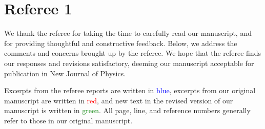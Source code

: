 \documentclass[preprint]{revtex4-1}
\newcommand{\1}{\mathds{1}}
\newcommand{\blue}[1]{\textcolor{blue}{#1}}
\newcommand{\red}[1]{\textcolor{red}{#1}}
\newcommand{\green}[1]{\textcolor{green}{#1}}
\begin{document}
\section*{Referee 1}

We thank the referee for taking the time to carefully read our
manuscript, and for providing thoughtful and constructive feedback.
Below, we address the comments and concerns brought up by the referee.
We hope that the referee finds our responses and revisions
satisfactory, deeming our manuscript acceptable for publication in New
Journal of Physics.

Excerpts from the referee reports are written in \blue{blue}, excerpts
from our original manuscript are written in \red{red}, and new text in
the revised version of our manuscript is written in \green{green}.
All page, line, and reference numbers generally refer to those in our
original manuscript.
\end{document}
